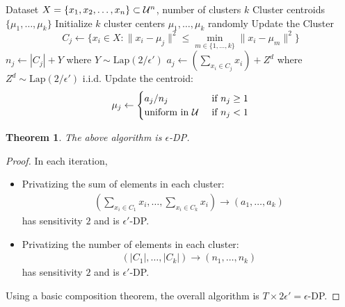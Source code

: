 \documentclass[11pt, a4paper]{article}
\newtheorem{theorem}{Theorem}
\begin{document}
\begin{algorithm}[h!]
\caption{DP k-Means Clustering}
\begin{algorithmic}[1]
\REQUIRE Dataset $X = \{x_1, x_2, \dots, x_n\} \subset {\cal U}^n$, number of clusters $k$
\ENSURE Cluster centroids $\{\mu_1, \dots, \mu_k\}$
\STATE Initialize $k$ cluster centers $\mu_1, \dots, \mu_k$ randomly
    \STATE  Update the Cluster
        \[
        C_j \leftarrow \{ x_i \in X: \|x_i - \mu_j\|^2 \leq \min_{m \in \{1, \dots, k\}} \|x_i - \mu_m\|^2\}
        \]
    \ENDFOR
        \STATE $n_j \leftarrow  |C_j| + Y$ where $Y\sim \mbox{Lap}(2/\epsilon')$
        \STATE $a_j \leftarrow \left(\sum_{x_i \in C_j} x_i \right) + Z^d$ where $Z^d\sim \mbox{Lap}(2/\epsilon')$ i.i.d.
        \STATE Update the centroid:
        \[
        \mu_j \leftarrow 
        \begin{cases}
            a_j / n_j &\mbox{ if $n_j \geq 1$}\\
            \mbox{uniform in ${\cal U}$} &\mbox{ if $n_j < 1$}\\
        \end{cases}
        \]
    \ENDFOR
\ENDFOR
\end{algorithmic}
\end{algorithm}

\begin{theorem}
    The above algorithm is $\epsilon$-DP.
\end{theorem}
\begin{proof}
    In each iteration,
    \begin{itemize}
        \item  Privatizing the sum of elements in each cluster:
    \begin{align}
        \left(\sum_{x_i\in C_1} x_i, \dots, \sum_{x_i\in C_k} x_i \right) \rightarrow (a_1, \dots, a_k)
    \end{align}
    has sensitivity $2$ and is $\epsilon'$-DP.
        \item Privatizing the number of elements in each cluster:
    \begin{align}
        (|C_1|, \dots, |C_k|) \rightarrow (n_1, \dots, n_k)
    \end{align}
    has sensitivity $2$ and is $\epsilon'$-DP.
    \end{itemize}
    Using a basic composition theorem, the overall algorithm is $T \times 2\epsilon' = \epsilon$-DP.
\end{proof}
\end{document}
